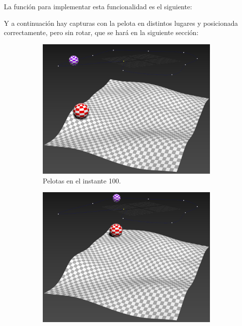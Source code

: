 La función para implementar esta funcionalidad es el siguiente:



\bigskip
\newpage

Y a continuación hay capturas con la pelota en distintos lugares y posicionada correctamente, pero sin rotar, que se hará en la siguiente sección:


\begin{figure}[H]
    \centering 
	\begin{subfigure}[t]{0.48\textwidth}
	    \centering
	    \includegraphics[width=\textwidth]{imagenes/posicion/100.jpg}
        \caption{Pelotas en el instante 100.}
    \end{subfigure}
    \hfill 
	\begin{subfigure}[t]{0.48\textwidth}
	    \centering
	    \includegraphics[width=\textwidth]{imagenes/posicion/185.jpg}

\end{subfigure}
\end{figure}
